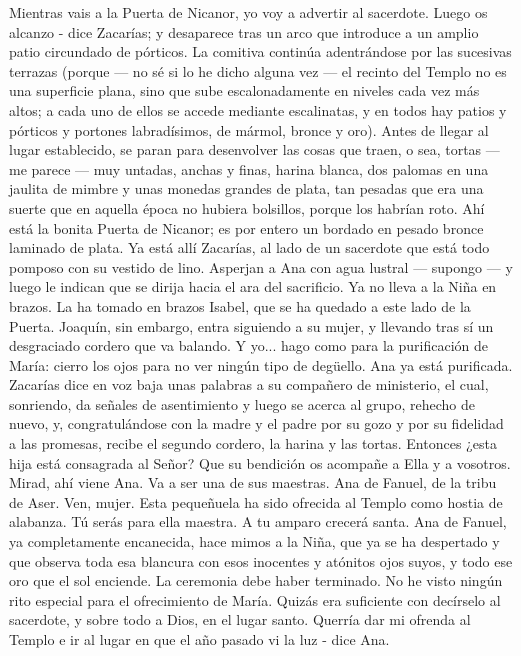 \documentclass[12pt]{book} %
\begin{document}
Mientras vais a la Puerta de Nicanor, yo voy a advertir al sacerdote. Luego os alcanzo - dice Zacarías; y desaparece tras 
un arco que introduce a un amplio patio circundado de pórticos. 
La comitiva continúa adentrándose por las sucesivas terrazas (porque — no sé si lo he dicho alguna vez — el recinto del Templo no es una superficie plana, sino que sube escalonadamente en niveles cada vez más altos; a cada uno de ellos se accede mediante escalinatas, y en todos hay patios y pórticos y portones labradísimos, de mármol, bronce y oro). 
Antes de llegar al lugar establecido, se paran para desenvolver las cosas que traen, o sea, tortas — me parece — muy 
untadas, anchas y finas, harina blanca, dos palomas en una jaulita de mimbre y unas monedas grandes de plata, tan pesadas que era una suerte que en aquella época no hubiera bolsillos, porque los habrían roto. 
Ahí está la bonita Puerta de Nicanor; es por entero un bordado en pesado bronce laminado de plata. Ya está allí Zacarías, al lado de un sacerdote que está todo pomposo con su vestido de lino. 
Asperjan a Ana con agua lustral — supongo — y luego le indican que se dirija hacia el ara del sacrificio. Ya no lleva a la Niña en brazos. La ha tomado en brazos Isabel, que se ha quedado a este lado de la Puerta. 
Joaquín, sin embargo, entra siguiendo a su mujer, y llevando tras sí un desgraciado cordero que va balando. Y yo... hago 
como para la purificación de María: cierro los ojos para no ver ningún tipo de degüello. 
Ana ya está purificada. 
Zacarías dice en voz baja unas palabras a su compañero de ministerio, el cual, sonriendo, da señales de asentimiento y luego se acerca al grupo, rehecho de nuevo, y, congratulándose con la madre y el padre por su gozo y por su fidelidad a las promesas, recibe el segundo cordero, la harina y las tortas. 
Entonces ¿esta hija está consagrada al Señor? Que su bendición os acompañe a Ella y a vosotros. Mirad, ahí viene Ana. Va a ser una de sus maestras. Ana de Fanuel, de la tribu de Aser. Ven, mujer. Esta pequeñuela ha sido ofrecida al Templo como hostia de alabanza. Tú serás para ella maestra. A tu amparo crecerá santa. 
Ana de Fanuel, ya completamente encanecida, hace mimos a la Niña, que ya se ha despertado y que observa toda esa 
blancura con esos inocentes y atónitos ojos suyos, y todo ese oro que el sol enciende. 
La ceremonia debe haber terminado. No he visto ningún rito especial para el ofrecimiento de María. Quizás era 
suficiente con decírselo al sacerdote, y sobre todo a Dios, en el lugar santo. 
Querría dar mi ofrenda al Templo e ir al lugar en que el año pasado vi la luz - dice Ana. 
\end{document}
